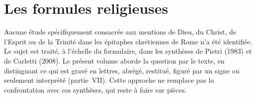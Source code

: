 \section{Les formules religieuses}

Aucune étude spécifiquement consacrée aux mentions de Dieu, du Christ, de l’Esprit ou de la Trinité dans les épitaphes chrétiennes de Rome n’a été identifiée. Le sujet est traité, à l’échelle du formulaire, dans les synthèses de Pietri (1983) et de Carletti (2008). Le présent volume aborde la question par le texte, en distinguant ce qui est gravé en lettres, abrégé, restitué, figuré par un signe ou seulement interprété (partie~VII). Cette approche ne remplace pas la confrontation avec ces synthèses, qui reste à faire sur pièces.
